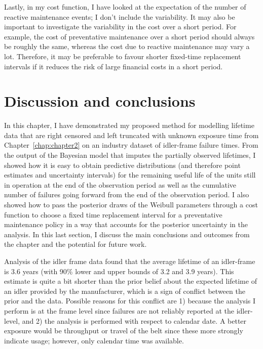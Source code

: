 Lastly, in my cost function, I have looked at the expectation of the number of reactive maintenance events; I don't include the variability. It may also be important to investigate the variability in the cost over a short period. For example, the cost of preventative maintenance over a short period should always be roughly the same, whereas the cost due to reactive maintenance may vary a lot. Therefore, it may be preferable to favour shorter fixed-time replacement intervals if it reduces the risk of large financial costs in a short period.

\section{Discussion and conclusions} \label{sec:idler-frame-conclusions}

In this chapter, I have demonstrated my proposed method for modelling lifetime data that are right censored and left truncated with unknown exposure time from Chapter~\ref{chap:chapter2} on an industry dataset of idler-frame failure times. From the output of the Bayesian model that imputes the partially observed lifetimes, I showed how it is easy to obtain predictive distributions (and therefore point estimates and uncertainty intervals) for the remaining useful life of the units still in operation at the end of the observation period as well as the cumulative number of failures going forward from the end of the observation period. I also showed how to pass the posterior draws of the Weibull parameters through a cost function to choose a fixed time replacement interval for a preventative maintenance policy in a way that accounts for the posterior uncertainty in the analysis. In this last section, I discuss the main conclusions and outcomes from the chapter and the potential for future work. 

Analysis of the idler frame data found that the average lifetime of an idler-frame is $3.6$ years (with 90\% lower and upper bounds of 3.2 and 3.9 years). This estimate is quite a bit shorter than the prior belief about the expected lifetime of an idler provided by the manufacturer, which is a sign of conflict between the prior and the data. Possible reasons for this conflict are 1) because the analysis I perform is at the frame level since failures are not reliably reported at the idler-level, and 2) the analysis is performed with respect to calendar date. A better exposure would be throughput or travel of the belt since these more strongly indicate usage; however, only calendar time was available.

